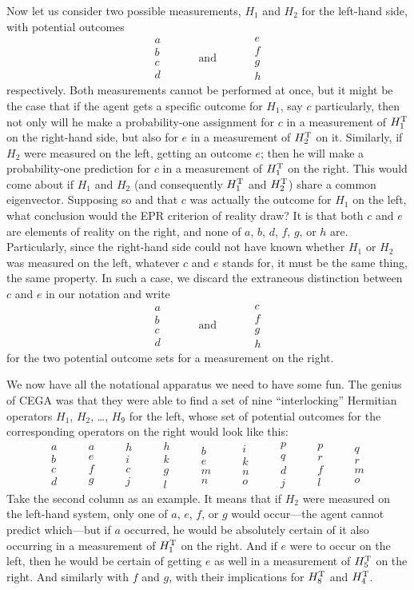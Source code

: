 \documentclass[aps,pra,superscriptaddress,12pt,tightenlines,nofootinbib]{revtex4-2}
\newcommand{\veec}[4]{%
\begin{array}{c}{\!\!#1\!\!}\\{\!\!#2\!\!}\\{\!\!#3\!\!}\\{\!\!#4\!\!}\end{array}}
\begin{document}
Now let us consider two possible measurements, $H_1$ and $H_2$ for the left-hand side, with potential outcomes
\begin{equation}
\veec abcd \quad\qquad\mbox{and}\qquad\quad \veec efgh
\end{equation}
respectively.  Both measurements cannot be performed at once, but it might be the case that if the agent gets a specific outcome for $H_1$, say $c$ particularly, then not only will he make a probability-one assignment for $c$ in a measurement of $H_1^{\rm T}$ on the right-hand side, but also for $e$ in a measurement of $H_2^{\rm T}$ on it.  Similarly, if $H_2$ were measured on the left, getting an outcome $e$; then he will make a probability-one prediction for $c$ in a measurement of $H_1^{\rm T}$ on the right.  This would come about if $H_1$ and $H_2$ (and consequently $H_1^{\rm T}$ and $H_2^{\rm T}$) share a common eigenvector.  Supposing so and that $c$ was actually the outcome for $H_1$ on the left, what conclusion would the EPR criterion of reality draw?  It is that both $c$ and $e$ are elements of reality on the right, and none of $a$, $b$, $d$, $f$, $g$, or $h$ are.  Particularly, since the right-hand side could not have known whether $H_1$ or $H_2$ was measured on the left, whatever $c$ and $e$ stands for, it must be the same thing, the same property.  In such a case, we discard the extraneous distinction between $c$ and $e$ in our notation and write
\begin{equation}
\veec abcd \quad\qquad\mbox{and}\qquad\quad \veec cfgh
\end{equation}
for the two potential outcome sets for a measurement on the right.

We now have all the notational apparatus we need to have some fun.  The genius of CEGA was that they were able to find a set of nine ``interlocking'' Hermitian operators $H_1$, $H_2$, \ldots, $H_9$ for the left, whose set of potential outcomes for the corresponding operators on the right would look like this:
\begin{equation}
\veec abcd \qquad \veec aefg \qquad \veec hicj\qquad \veec hkgl\qquad \veec bemn\qquad \veec ikno\qquad \veec pqdj\qquad \veec prfl\qquad \veec qrmo \label{BurlIves}
\end{equation}
Take the second column as an example.  It means that if $H_2$ were measured on the left-hand system, only one of $a$, $e$, $f$, or $g$ would occur---the agent cannot predict which---but if $a$ occurred, he would be absolutely certain of it also occurring in a measurement of $H_1^{\rm T}$ on the right.  And if $e$ were to occur on the left, then he would be certain of getting $e$ as well in a measurement of $H_5^{\rm T}$ on the right.  And similarly with $f$ and $g$, with their implications for $H_8^{\rm T}$ and $H_4^{\rm T}$.
\end{document}

